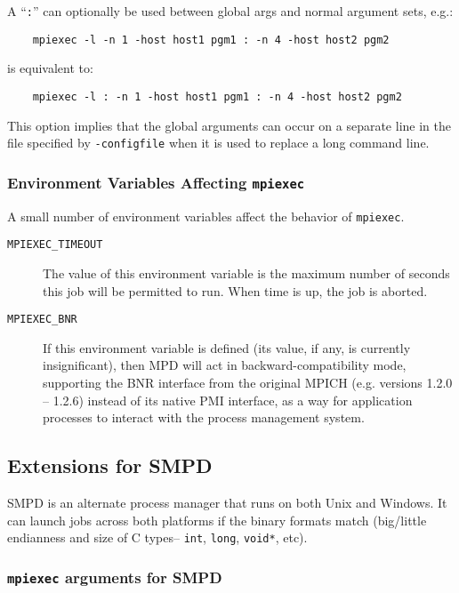\documentclass[dvipdfm,11pt]{article}
\begin{document}
A ``\texttt{:}'' can optionally be used between global args
and normal argument sets, e.g.:
\begin{verbatim}
    mpiexec -l -n 1 -host host1 pgm1 : -n 4 -host host2 pgm2
\end{verbatim}
is equivalent to:
\begin{verbatim}
    mpiexec -l : -n 1 -host host1 pgm1 : -n 4 -host host2 pgm2
\end{verbatim}
This option implies that the global arguments can occur on a separate
line in the file specified by \texttt{-configfile} when it is used to 
replace a long command line.

\subsubsection{Environment Variables Affecting \texttt{mpiexec}}
\label{sec:mpd-mpiexec-env}

A small number of environment variables affect the behavior of
\texttt{mpiexec}. 

\begin{description}
\item[\texttt{MPIEXEC\_TIMEOUT}] The value of this environment variable is the
  maximum number of seconds this job will be permitted to run.  When
  time is up, the job is aborted. 
\item[\texttt{MPIEXEC\_BNR}] If this environment variable is defined
  (its value, if any, is currently insignificant), then MPD will act in
  backward-compatibility mode, supporting the BNR interface from the
  original MPICH (e.g. versions 1.2.0 -- 1.2.6)
  instead of its native PMI interface, as a way for application
  processes to interact with the process management system.
\end{description}


\subsection{Extensions for SMPD}
\label{sec:extensions-smpd}

SMPD is an alternate process manager that runs on both Unix and Windows.
It can launch jobs across both platforms if the binary formats match 
(big/little endianness and size of C types-- \texttt{int},
\texttt{long}, \texttt{void*}, etc).


\subsubsection{\texttt{mpiexec} arguments for SMPD}
\label{sec:mpiexec-smpd}
\end{document}
